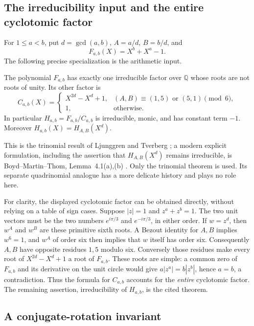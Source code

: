 \subsection{The irreducibility input and the entire cyclotomic factor}

For $1\le a<b$, put $d=\gcd(a,b)$, $A=a/d$, $B=b/d$, and
\[
F_{a,b}(X)=X^b+X^a-1.
\]
The following precise specialization is the arithmetic input.

\begin{theorem}
\label{rigid:thm:trinomial-input}
The polynomial $F_{a,b}$ has exactly one irreducible factor over
$\mathbb Q$ whose roots are not roots of unity.  Its other factor is
\[
C_{a,b}(X)=
\begin{cases}
 X^{2d}-X^d+1,&(A,B)\equiv(1,5)\text{ or }(5,1)\pmod6,\\
 1,&\text{otherwise}.
\end{cases}
\]
In particular $H_{a,b}=F_{a,b}/C_{a,b}$ is irreducible, monic,
and has constant term $-1$.  Moreover
$H_{a,b}(X)=H_{A,B}(X^d)$.
\end{theorem}

This is the trinomial result of Ljunggren and Tverberg
\cite{rigid:Ljunggren1960,rigid:Tverberg1960}; a modern explicit formulation,
including the assertion that $H_{A,B}(X^d)$ remains irreducible, is
Boyd--Martin--Thom, Lemma~4.1(a),(b) \cite{rigid:BoydMartinThom2015}.
Only the trinomial theorem is used.  Its separate quadrinomial analogue
has a more delicate history and plays no role here.

For clarity, the displayed cyclotomic factor can be obtained directly,
without relying on a table of sign cases.  Suppose $|z|=1$ and
$z^a+z^b=1$.  The two unit vectors must be the two numbers
$e^{i\pi/3}$ and $e^{-i\pi/3}$, in either order.  If $w=z^d$, then
$w^A$ and $w^B$ are these primitive sixth roots.  A Bezout identity for
$A,B$ implies $w^6=1$, and $w^A$ of order six then implies that $w$
itself has order six.  Consequently $A,B$ have opposite residues
$1,5$ modulo six.  Conversely those residues make every root of
$X^{2d}-X^d+1$ a root of $F_{a,b}$.  These roots are simple: a common
zero of $F_{a,b}$ and its derivative on the unit circle would give
$a|z^a|=b|z^b|$, hence $a=b$, a contradiction.  Thus the formula for
$C_{a,b}$ accounts for the \emph{entire} cyclotomic factor.  The
remaining assertion, irreducibility of $H_{a,b}$, is the cited theorem.

\subsection{A conjugate-rotation invariant}

